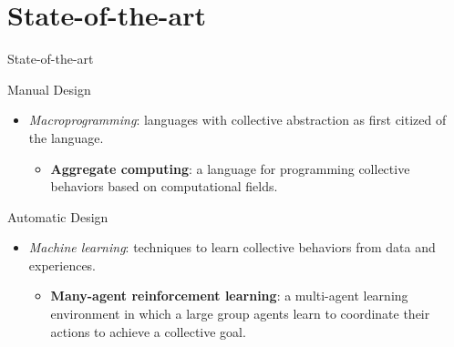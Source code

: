 \documentclass[presentation, 8pt,169]{beamer}\mode<presentation>{\usetheme{AMSBolognaFC}}
\begin{document}
\section{State-of-the-art}
\begin{frame}{State-of-the-art}
  \begin{exampleblock}{Manual Design}
    \begin{itemize}
    \item \emph{Macroprogramming}: languages with collective abstraction as first citized of the language.
    \begin{itemize}
      \item \textbf{Aggregate computing}: a language for programming collective behaviors based on computational fields.
    \end{itemize}
  \end{itemize}
  \end{exampleblock}
  \begin{exampleblock}{Automatic Design}
  \begin{itemize}
    \item \emph{Machine learning}: techniques to learn collective behaviors from data and experiences.
    \begin{itemize}
      \item \textbf{Many-agent reinforcement learning}: a multi-agent learning environment in which a large group agents learn to coordinate their actions to achieve a collective goal.
    \end{itemize}
  \end{itemize}
  \end{exampleblock}
\end{frame}
\end{document}
